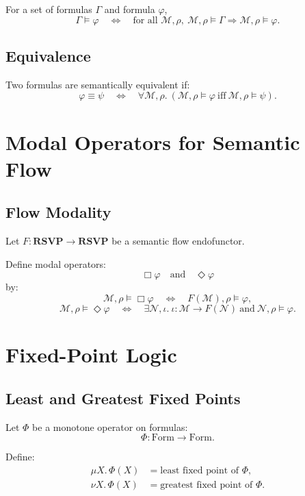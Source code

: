 For a set of formulas $\Gamma$ and formula $\varphi$,
\[
\Gamma \models \varphi
\quad\Longleftrightarrow\quad
\text{for all }\mathcal{M},\rho,\ 
\mathcal{M},\rho\models\Gamma\Rightarrow\mathcal{M},\rho\models\varphi.
\]

\subsection{Equivalence}

Two formulas are semantically equivalent if:
\[
\varphi \equiv \psi
\quad\Longleftrightarrow\quad
\forall\mathcal{M},\rho.\ 
(\mathcal{M},\rho\models\varphi \ \text{iff}\ \mathcal{M},\rho\models\psi).
\]

\section{Modal Operators for Semantic Flow}

\subsection{Flow Modality}

Let $F:\mathbf{RSVP}\to\mathbf{RSVP}$ be a semantic flow endofunctor.

Define modal operators:
\[
\Box\varphi \quad\text{and}\quad \Diamond\varphi
\]
by:
\[
\mathcal{M},\rho\models\Box\varphi
\quad\Longleftrightarrow\quad
F(\mathcal{M}),\rho\models\varphi,
\]
\[
\mathcal{M},\rho\models\Diamond\varphi
\quad\Longleftrightarrow\quad
\exists \mathcal{N},\iota.\  
\iota:\mathcal{M}\to F(\mathcal{N})\ \text{and}\ \mathcal{N},\rho\models\varphi.
\]

\section{Fixed-Point Logic}

\subsection{Least and Greatest Fixed Points}

Let $\Phi$ be a monotone operator on formulas:
\[
\Phi : \mathrm{Form}\to\mathrm{Form}.
\]

Define:
\begin{align*}
\mu X.\,\Phi(X) &= \text{least fixed point of }\Phi,\\
\nu X.\,\Phi(X) &= \text{greatest fixed point of }\Phi.
\end{align*}

